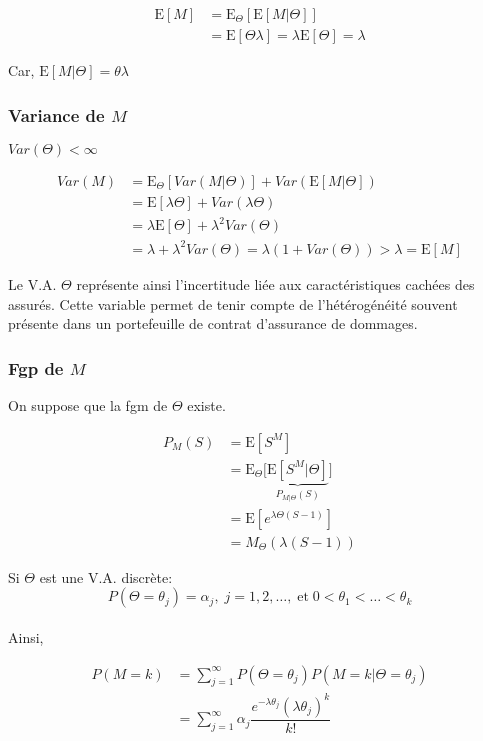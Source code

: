 \documentclass[]{book}
\theoremstyle{definition}
\theoremstyle{definition}
\theoremstyle{definition}
\theoremstyle{remark}
\begin{document}
\begin{align*}
\text{E}[M]& =\text{E}_{\Theta}\left [\text{E}[M|\Theta]\right ]\\
& =\text{E}[\Theta \lambda] = \lambda\text{E}[\Theta]=\lambda
\end{align*}

Car, \(\text{E}[M|\Theta]=\theta\lambda\)

\subsubsection{\texorpdfstring{Variance de
\(M\)}{Variance de M}}\label{variance-de-m}

\(Var(\Theta)<\infty\)

\begin{align*}
Var(M)& = \text{E}_{\Theta}\left [Var(M|\Theta)\right ]+Var\left (\text{E}[M|\Theta]\right )\\
& =\text{E}[\lambda\Theta] + Var(\lambda\Theta)\\
& =\lambda\text{E}[\Theta]+\lambda^2 Var(\Theta)\\
& =\lambda +\lambda^2 Var(\Theta)=\lambda(1+Var(\Theta))>\lambda=\text{E}[M]
\end{align*}

Le V.A. \(\Theta\) représente ainsi l'incertitude liée aux
caractéristiques cachées des assurés. Cette variable permet de tenir
compte de l'hétérogénéité souvent présente dans un portefeuille de
contrat d'assurance de dommages.

\subsubsection{\texorpdfstring{Fgp de
\(M\)}{Fgp de M}}\label{fgp-de-m-2}

On suppose que la fgm de \(\Theta\) existe.

\begin{align*}
P_M(S)& =\text{E}[S^M]\\
& =\text{E}_{\Theta}\big [\underbrace{\text{E}[S^M|\Theta]}_{P_{M|\Theta}(S)}\big ]\\
& =\text{E}[e^{\lambda \Theta(S-1)}]\\
& =M_\Theta\left (\lambda(S-1)\right )
\end{align*}

Si \(\Theta\) est une V.A. discrète: \[
P(\Theta=\theta_j)=\alpha_j,\;j=1,2,\dots,\;\text{et}\;0<\theta_1<\dots<\theta_k
\]\\
Ainsi,

\begin{align*}
P(M=k)& = \sum^\infty_{j=1} P(\Theta=\theta_j)P(M=k|\Theta=\theta_j)\\
& = \sum^\infty_{j=1} \alpha_j \dfrac{e^{-\lambda \theta_j}(\lambda\theta_j)^k}{k!}  
\end{align*}
\end{document}
